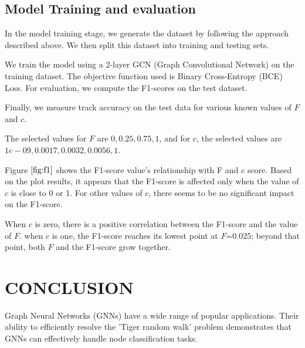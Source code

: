 \documentclass{article}
\begin{document}
  \subsection{Model Training and evaluation}
  \label{ssec:model}

  In the model training stage, we generate the dataset by following the approach described above. We then split this dataset into training and testing sets.

  We train the model using a 2-layer GCN (Graph Convolutional Network) on the training dataset. The objective function used is Binary Cross-Entropy (BCE) Loss.
  For evaluation, we compute the F1-scores on the test dataset.

  Finally, we measure track accuracy on the test data for various known values of $F$ and $c$.

  The selected values for $F$ are $0, 0.25, 0.75, 1$, and for $c$, the selected values are $1e-09, 0.0017, 0.0032, 0.0056, 1$.
  



Figure $\ref{fig:f1}$ shows the F1-score value's relationship with F and c score.
Based on the plot results, it appears that the F1-score is affected only when the value of $c$ is close to 0 or 1. For other values of $c$, there seems to be no significant impact on the F1-score.

When $c$ is zero, there is a positive correlation between the F1-score and the value of $F$.
when $c$ is one, the F1-score reaches its lowest point at 
$F$=0.025; beyond that point, both $F$ and the F1-score grow together.

\section{CONCLUSION}
\label{sec:conclusion}

Graph Neural Networks (GNNs) have a wide range of popular applications. Their ability to efficiently resolve the 'Tiger random walk' problem demonstrates that GNNs can effectively handle node classification tasks.
\end{document}
